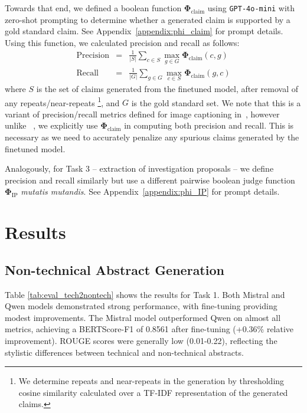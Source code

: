 \documentclass[11pt]{article}
\begin{document}
Towards that end, we defined a boolean function $\mathbf{\Phi}_{\textrm{claim}}$ using \texttt{GPT-4o-mini} with zero-shot prompting to determine whether a generated claim is supported by a gold standard claim. See Appendix~\ref{appendix:phi_claim} for prompt details. Using this function, we calculated precision and recall as follows:
\begin{equation*}
\left.\begin{aligned}
\text{Precision}&=&\frac{1}{|S|} \sum_{c \in S} \max_{g \in G} \mathbf{\Phi}_{\textrm{claim}}(c, g)\\
\text{Recall}&=&\frac{1}{|G|} \sum_{g \in G} \max_{c \in S} \mathbf{\Phi}_{\textrm{claim}}(g, c)
\end{aligned}\right.
\end{equation*}
\noindent where $S$ is the set of claims generated from the finetuned model, after removal of any repeats/near-repeats
\footnote{We determine repeats and near-repeats in the generation by thresholding cosine similarity calculated over a TF-IDF representation of the generated claims.},
 and $G$ is the gold standard set. We note that this is a variant of precision/recall metrics defined for image captioning in~\cite{deitke2024molmo}, however unlike ~\citeauthor{deitke2024molmo}, we explicitly use $\mathbf{\Phi}_{\textrm{claim}}$ in computing both precision and recall. This is necessary as we need to accurately penalize any spurious claims generated by the finetuned model.

Analogously, for Task 3 -- extraction of investigation proposals -- we define precision and recall similarly but use a different pairwise boolean judge function $\mathbf{\Phi}_{\textrm{IP}}$ \textit{mutatis mutandis}. See Appendix~\ref{appendix:phi_IP} for prompt details.


\section{Results}

\subsection{Non-technical Abstract Generation}
Table \ref{tab:eval_tech2nontech} shows the results for Task 1. Both Mistral and Qwen models demonstrated strong performance, with fine-tuning providing modest improvements. The Mistral model outperformed Qwen on almost all metrics, achieving a BERTScore-F1 of 0.8561 after fine-tuning (+0.36\% relative improvement). ROUGE scores were generally low (0.01-0.22), reflecting the stylistic differences between technical and non-technical abstracts.
\end{document}
